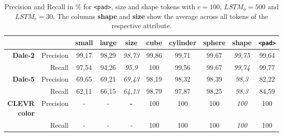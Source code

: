 \documentclass[11pt,a4paper]{article}
\begin{document}
\begin{table}[ht]
  \centering
  \begin{tabular}{rr|cc|c|ccc|c|c}
    \toprule
                                     &             & {small} & {large} & \textbf{size}  & {cube}  & {cylinder} & {sphere} & \textbf{shape} & {\texttt{<pad>}} \\\midrule
    \multirow{2}{*}{\textbf{Dale-2}} & {Precision} & {99,17} & {98,29} & \emph{98,73} & {99,86} & {99,71}    & {99,67}  & \emph{99,75} & {99,64}          \\
                                     & {Recall}    & {97,54} & {94,26} & \emph{95,9}  & {100}   & {99,56}    & {99,67}  & \emph{99,74} & {99,77}          \\\midrule
    \multirow{2}{*}{\textbf{Dale-5}} & {Precision} & {69,65} & {69,21} & \emph{69,43} & {98,19} & {98,32}    & {98,39}  & \emph{98,3}  & {82,22}          \\
                                     & {Recall}    & {62,11} & {66,15} & \emph{64,13} & {98,79} & {97,87}    & {98,25}  & \emph{98,3}  & {84,59}          \\\midrule
    \multirowcell{2}[0pt][r]{\textbf{CLEVR}                                                                                                                   \\\textbf{color}} & {Precision}  & {-}     & {-}     & \textbf{-}     & {100}   & {100}      & {100}    & \emph{100}   & {100}   \\
                                     & {Recall}    & {-}     & {-}     & \emph{-}     & {100}   & {100}      & {100}    & \emph{100}   & {100}            \\
    \bottomrule
  \end{tabular}
  \caption{Precision and Recall in \% for \texttt{<pad>}, size and shape tokens with $e=100$, $LSTM_o=500$ and $LSTM_e=30$. The columns \textbf{shape} and \textbf{size} show the average across all tokens of the respective attribute.}
  \label{tab:results:bb-re-generator_size-shape}
\end{table}
\end{document}
